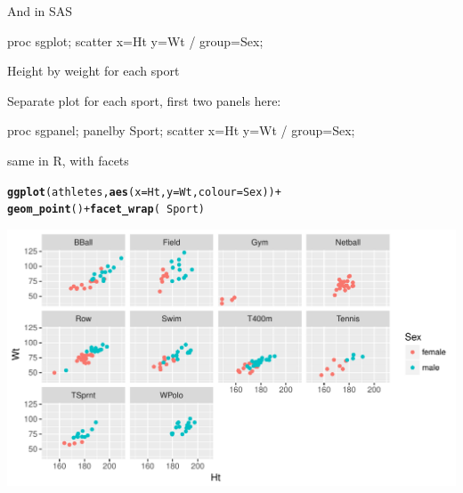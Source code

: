 \documentclass[unknownkeysallowed]{beamer}\usepackage[]{graphicx}\usepackage[]{color}
\makeatletter
\def\maxwidth{ %
  \ifdim\Gin@nat@width>\linewidth
    \linewidth
  \else
    \Gin@nat@width
  \fi
}
\newcommand{\hlopt}[1]{\textcolor[rgb]{0,0,0}{#1}}%
\newcommand{\hlstd}[1]{\textcolor[rgb]{0.345,0.345,0.345}{#1}}%
\newcommand{\hlkwc}[1]{\textcolor[rgb]{0.333,0.667,0.333}{#1}}%
\newcommand{\hlkwd}[1]{\textcolor[rgb]{0.737,0.353,0.396}{\textbf{#1}}}%
\newenvironment{kframe}{%
 \def\at@end@of@kframe{}%
 \ifinner\ifhmode%
  \def\at@end@of@kframe{\end{minipage}}%
  \begin{minipage}{\columnwidth}%
 \fi\fi%
 \def\FrameCommand##1{\hskip\@totalleftmargin \hskip-\fboxsep
 \colorbox{shadecolor}{##1}\hskip-\fboxsep
     \hskip-\linewidth \hskip-\@totalleftmargin \hskip\columnwidth}%
 \MakeFramed {\advance\hsize-\width
   \@totalleftmargin\z@ \linewidth\hsize
   \@setminipage}}%
 {\par\unskip\endMakeFramed%
 \at@end@of@kframe}
\newenvironment{knitrout}{}{} %
\makeatother
\begin{document}
\begin{frame}[fragile]{And in SAS}
  
  \begin{Sascode}[store=gk]
proc sgplot;
  scatter x=Ht y=Wt / group=Sex;
  \end{Sascode}
  
  
\end{frame}

\begin{frame}[fragile]{Height by weight for each sport}
  
  Separate plot for each sport, first two panels here:
  
  \begin{Sascode}[store=gl]
proc sgpanel;
  panelby Sport;
  scatter x=Ht y=Wt / group=Sex;
  \end{Sascode}
  
  
  
\end{frame}

\begin{frame}[fragile]{same in R, with facets}
  
\begin{knitrout}
\color{fgcolor}\begin{kframe}
\begin{alltt}
\hlkwd{ggplot}\hlstd{(athletes,}\hlkwd{aes}\hlstd{(}\hlkwc{x}\hlstd{=Ht,}\hlkwc{y}\hlstd{=Wt,}\hlkwc{colour}\hlstd{=Sex))}\hlopt{+}
  \hlkwd{geom_point}\hlstd{()}\hlopt{+}\hlkwd{facet_wrap}\hlstd{(}\hlopt{~}\hlstd{Sport)}
\end{alltt}
\end{kframe}
\includegraphics[width=\maxwidth]{figure/unnamed-chunk-35-1} 

\end{knitrout}
  
  
\end{frame}
\end{document}
